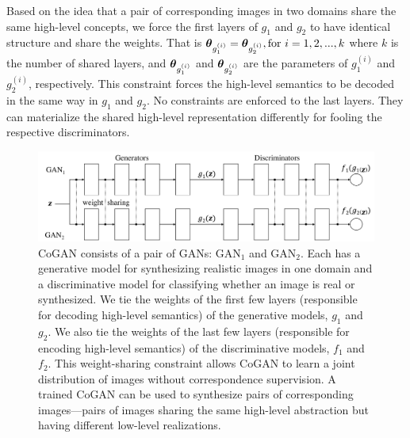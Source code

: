Based on the idea that a pair of corresponding images in two domains share the same high-level concepts, we force the first layers of $g_1$ and $g_2$ to have identical structure and share the weights. That is 
$\text{\boldmath$\theta$}_{g_1^{(i)}}=\text{\boldmath$\theta$}_{g_2^{(i)}}, \text{for } i=1,2,...,k$
where $k$ is the number of shared layers, and $\text{\boldmath$\theta$}_{g_1^{(i)}}$ and $\text{\boldmath$\theta$}_{g_2^{(i)}}$ are the parameters of $g_1^{(i)}$ and $g_2^{(i)}$, respectively. This constraint forces the high-level semantics to be decoded in the same way in $g_1$ and $g_2$. No constraints are enforced to the last layers. They can materialize the shared high-level representation differently for fooling the respective discriminators.

\begin{figure}[t!]
\centering
\includegraphics[trim=0.05in 0.1in 0.05in 0.2in,width=.96\linewidth]{overview_landscape_very_tight.pdf}
\caption{\small CoGAN consists of a pair of GANs: $\text{GAN}_1$ and $\text{GAN}_2$. Each has a generative model for synthesizing realistic images in one domain and a discriminative model for classifying whether an image is real or synthesized. We tie the weights of the first few layers (responsible for decoding high-level semantics) of the generative models, $g_1$ and $g_2$. We also tie the weights of the last few layers (responsible for encoding high-level semantics) of the discriminative models, $f_1$ and $f_2$. This weight-sharing constraint allows CoGAN to learn a joint distribution of images without correspondence supervision. A trained CoGAN can be used to synthesize pairs of corresponding images---pairs of images sharing the same high-level abstraction but having different low-level realizations.}
\label{fig::DGAN}
\end{figure}

